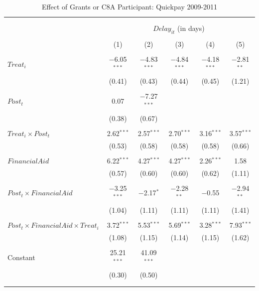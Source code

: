\documentclass[]{article}
\begin{document}
\begin{table}[H] \centering 
  \caption{Effect of Grants or C8A Participant: Quickpay 2009-2011} 
  \label{} 
\small 
\begin{tabular}{@{\extracolsep{-2pt}}lccccc} 
\\[-1.8ex]\hline 
\hline \\[-1.8ex] 
\\[-1.8ex] & \multicolumn{5}{c}{$Delay_{it}$ (in days)} \\ 
\\[-1.8ex] & (1) & (2) & (3) & (4) & (5)\\ 
\hline \\[-1.8ex] 
 $Treat_i$ & $-$6.05$^{***}$ & $-$4.83$^{***}$ & $-$4.84$^{***}$ & $-$4.18$^{***}$ & $-$2.81$^{**}$ \\ 
  & (0.41) & (0.43) & (0.44) & (0.45) & (1.21) \\ 
  & & & & & \\ 
 $Post_t$ & 0.07 & $-$7.27$^{***}$ &  &  &  \\ 
  & (0.38) & (0.67) &  &  &  \\ 
  & & & & & \\ 
 $Treat_i \times Post_t$ & 2.62$^{***}$ & 2.57$^{***}$ & 2.70$^{***}$ & 3.16$^{***}$ & 3.57$^{***}$ \\ 
  & (0.53) & (0.58) & (0.58) & (0.58) & (0.66) \\ 
  & & & & & \\ 
 $FinancialAid$ & 6.22$^{***}$ & 4.27$^{***}$ & 4.27$^{***}$ & 2.26$^{***}$ & 1.58 \\ 
  & (0.57) & (0.60) & (0.60) & (0.62) & (1.11) \\ 
  & & & & & \\ 
 $Post_t \times FinancialAid$ & $-$3.25$^{***}$ & $-$2.17$^{*}$ & $-$2.28$^{**}$ & $-$0.55 & $-$2.94$^{**}$ \\ 
  & (1.04) & (1.11) & (1.11) & (1.11) & (1.41) \\ 
  & & & & & \\ 
 $Post_t \times FinancialAid \times Treat_i$ & 3.72$^{***}$ & 5.53$^{***}$ & 5.69$^{***}$ & 3.28$^{***}$ & 7.93$^{***}$ \\ 
  & (1.08) & (1.15) & (1.14) & (1.15) & (1.62) \\ 
  & & & & & \\ 
 Constant & 25.21$^{***}$ & 41.09$^{***}$ &  &  &  \\ 
  & (0.30) & (0.50) &  &  &  \\ 
  & & & & & \\ 
\hline \\[-1.8ex] 

\end{tabular}
\end{table}
\end{document}
